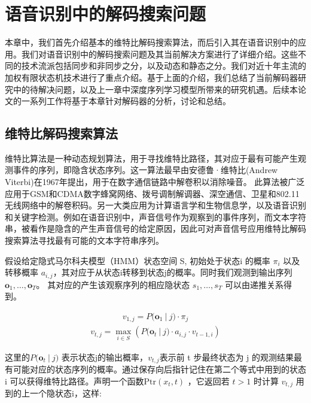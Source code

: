 
\chapter{语音识别中的解码搜索问题}
\label{chap:intro2}

本章中，我们首先介绍基本的维特比解码搜索算法，而后引入其在语音识别中的应用。我们对语音识别中的解码搜索问题及其当前解决方案进行了详细介绍。这些不同的技术流派包括同步和非同步之分，以及动态和静态之分。我们对近十年主流的加权有限状态机技术进行了重点介绍。基于上面的介绍，我们总结了当前解码器研究中的待解决问题，以及上一章中深度序列学习模型所带来的研究机遇。后续本论文的一系列工作将基于本章针对解码器的分析，讨论和总结。


\section{维特比解码搜索算法}
\label{chap:intro2-viterbi}

维特比算法是一种动态规划算法，用于寻找维特比路径，其对应于最有可能产生观测事件的序列，即隐含状态序列。这一算法最早由安德鲁·维特比(Andrew Viterbi)在1967年提出，用于在数字通信链路中解卷积以消除噪音。 此算法被广泛应用于GSM和CDMA数字蜂窝网络、拨号调制解调器、深空通信、卫星和802.11无线网络中的解卷积码。另一大类应用为计算语言学和生物信息学，以及语音识别和关键字检测。例如在语音识别中，声音信号作为观察到的事件序列，而文本字符串，被看作是隐含的产生声音信号的给定原因，因此可对声音信号应用维特比解码搜索算法寻找最有可能的文本字符串序列。

假设给定隐式马尔科夫模型（HMM）状态空间 S, 初始处于状态i 的概率 $\pi_{i}$ 以及转移概率 $a_{i,j}$，其对应于从状态i转移到状态j的概率。同时我们观测到输出序列 $\mathbf{o}_{1},\dots ,\mathbf{o}_{T}$。 其对应的产生该观察序列的相应隐状态 $s_{1},\dots ,s_{T}$ 可以由递推关系得到。

\begin{equation}
\begin{split}
v_{1,j}= {P} {\big (}\mathbf{o}_{1}\ |\ j{\big )}\cdot \pi _{j}
\end{split}
\end{equation}
\begin{equation}
\begin{split}
v_{t,j}=\max _{i\in S}\left( {P} {\big (}\mathbf{o}_{t}\ |\ j{\big )}\cdot a_{i,j}\cdot v_{t-1,i}\right)
\end{split}
\end{equation}

这里的$ {P} {\big (}\mathbf{o}_{t}\ |\ j{\big )}$ 表示状态j的输出概率，$v_{t,j}$表示前 t 步最终状态为 j 的观测结果最有可能对应的状态序列的概率。通过保存向后指针记住在第二个等式中用到的状态 i 可以获得维特比路径。声明一个函数$\mathrm {Ptr} (x_{t},t)$ ，它返回若 $t>1$ 时计算 $v_{t,j}$ 用到的上一个隐状态i，这样:

